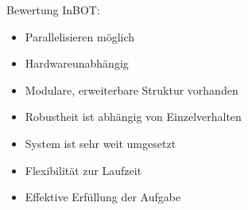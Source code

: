 Bewertung InBOT:
\begin{itemize}
	\item Parallelisieren möglich
	\item Hardwareunabhängig
	\item Modulare, erweiterbare Struktur vorhanden
	\item Robustheit ist abhängig von Einzelverhalten
	\item System ist sehr weit umgesetzt
	\item Flexibilität zur Laufzeit
	\item Effektive Erfüllung der Aufgabe
\end{itemize}